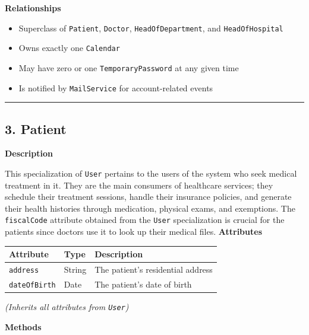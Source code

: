 \documentclass[12pt, a4paper]{article}
\begin{document}
\textbf{Relationships}

\begin{itemize}
    \item Superclass of \texttt{Patient}, \texttt{Doctor}, \texttt{HeadOfDepartment}, and \texttt{HeadOfHospital}
    \item Owns exactly one \texttt{Calendar}
    \item May have zero or one \texttt{TemporaryPassword} at any given time
    \item Is notified by \texttt{MailService} for account-related events
\end{itemize}

\par\medskip\hrule\medskip

\subsection{3. Patient}\label{sec:3-patient}

\textbf{Description}

This specialization of \texttt{User} pertains to the users of the system who seek medical treatment in it. They are the main consumers of healthcare services; they schedule their treatment sessions, handle their insurance policies, and generate their health histories through medication, physical exams, and exemptions. The \texttt{fiscalCode} attribute obtained from the \texttt{User} specialization is crucial for the patients since doctors use it to look up their medical files.
\textbf{Attributes}

\begin{center}
\small
\renewcommand{\arraystretch}{1.35}
\begin{tabularx}{\textwidth}{|>{\raggedright\arraybackslash}p{3.4cm}|>{\raggedright\arraybackslash}p{3.3cm}|Y|}
\hline
{}
\textbf{Attribute} & \textbf{Type} & \textbf{Description} \\ \hline
\texttt{address} & String & The patient's residential address \\ \hline
\texttt{dateOfBirth} & Date & The patient's date of birth \\ \hline
\end{tabularx}
\end{center}

\emph{(Inherits all attributes from \texttt{User})}

\textbf{Methods}
\end{document}
